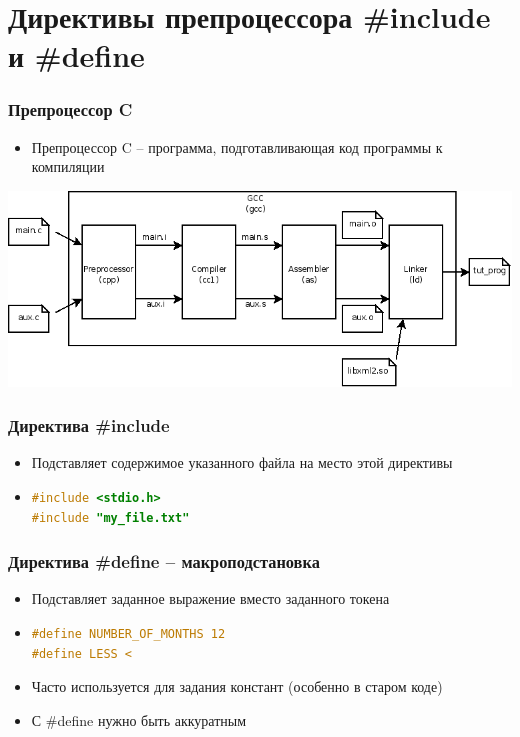 \documentclass[12pt,pdf,hyperref={unicode}]{beamer}
\begin{document}
\iffalse
\section{Директивы препроцессора \#include и \#define}


\begin{frame}[fragile]
\frametitle{Препроцессор C} 
\begin{itemize}
\item Препроцессор C -- программа, подготавливающая код программы к компиляции
\end{itemize}
\begin{center}
\includegraphics[width=0.95\linewidth]{images/compilation-stages.png}
\end{center}
\end{frame}


\begin{frame}[fragile]
\frametitle{Директива \#include} 
\begin{itemize}
\item Подставляет содержимое указанного файла на место этой директивы
\item \begin{lstlisting}[language=C,basicstyle=\ttfamily,keywordstyle=\color{blue}]
#include <stdio.h>
#include "my_file.txt"
\end{lstlisting}
\end{itemize}
\end{frame}

\begin{frame}[fragile]
\frametitle{Директива \#define -- макроподстановка} 
\begin{itemize}
\item Подставляет заданное выражение вместо заданного токена
\item \begin{lstlisting}[language=C,basicstyle=\ttfamily,keywordstyle=\color{blue}]
#define NUMBER_OF_MONTHS 12
#define LESS <
\end{lstlisting}
\item Часто используется для задания констант (особенно в старом коде)
\item С \#define нужно быть аккуратным
\end{itemize}
\end{frame}
\end{document}

